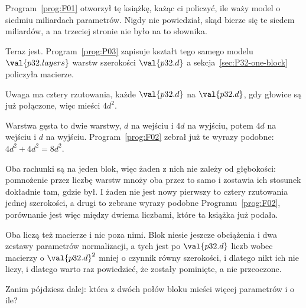 \begin{fr}
Program~\ref{prog:F01} otworzył tę książkę, każąc ci policzyć, ile waży model
o siedmiu miliardach parametrów. Nigdy nie powiedział, skąd bierze się te
siedem miliardów, a na trzeciej stronie nie było na to słownika.

Teraz jest. Program~\ref{prog:P03} zapisuje kształt tego samego modelu
\dash{} $\val{p32.layers}$ warstw szerokości $\val{p32.d}$ \dash{} a
sekcja~\ref{sec:P32-one-block} policzyła macierze.

Uwaga ma cztery rzutowania, każde $\val{p32.d}$ na $\val{p32.d}$, gdy głowice
są już połączone, więc mieści $4d^{2}$.

Warstwa gęsta to dwie warstwy, $d$ na wejściu i $4d$ na wyjściu, potem $4d$ na
wejściu i $d$ na wyjściu. Program~\ref{prog:F02} zebrał już te wyrazy
podobne: $4d^{2} + 4d^{2} = 8d^{2}$.

Oba rachunki są na jeden blok, więc żaden z nich nie zależy od głębokości:
pomnożenie przez liczbę warstw mnoży oba przez to samo i zostawia ich stosunek
dokładnie tam, gdzie był. I żaden nie jest nowy \dash{} pierwszy to cztery
rzutowania jednej szerokości, a drugi to zebrane wyrazy podobne
Programu~\ref{prog:F02}, porównanie jest więc między dwiema liczbami, które
ta książka już podała.

Oba liczą też macierze i nic poza nimi. Blok niesie jeszcze obciążenia i dwa
zestawy parametrów normalizacji, a tych jest po $\val{p32.d}$ liczb wobec
macierzy o $\val{p32.d}^{2}$ \dash{} mniej o czynnik równy szerokości, i
dlatego nikt ich nie liczy, i dlatego warto raz powiedzieć, że zostały
pominięte, a nie przeoczone.

Zanim pójdziesz dalej: która z dwóch połów bloku mieści więcej parametrów i o
ile?
\dotline
\nextframe
\end{fr}

